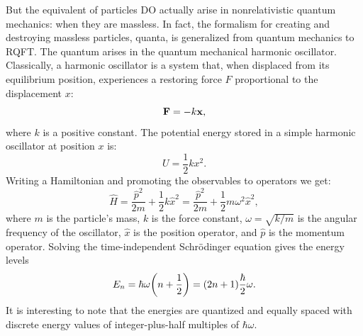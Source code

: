 But the equivalent of particles DO actually arise in nonrelativistic quantum mechanics: when they are massless. In fact, the formalism for creating and destroying massless particles, quanta, is generalized from quantum mechanics to RQFT. The quantum arises in the quantum mechanical harmonic oscillator. Classically, a harmonic oscillator is a system that, when displaced from its equilibrium position, experiences a restoring force $F$ proportional to the displacement $x$:
\begin{equation}
\vb{F}=-k\vb{x},
\end{equation}
where $k$ is a positive constant. The potential energy stored in a simple harmonic oscillator at position $x$ is:
\begin{equation}
U=\frac{1}{2}kx^2.
\end{equation}
Writing a Hamiltonian and promoting the observables to operators we get:
\begin{equation}
\hat{H} = \frac{\hat{p}^2}{2m} + \frac{1}{2}k\hat{x}^2 = \frac{\hat{p}^2}{2m} + \frac{1}{2}m\omega^2 \hat{x}^2,
\end{equation}
where $m$ is the particle's mass, $k$ is the force constant, $\omega = \sqrt{k/m}$ is the angular frequency of the oscillator, $\hat{x}$ is the position operator, and $\hat{p}$ is the momentum operator. Solving the time-independent Schr{\"o}dinger equation gives the energy levels
\begin{equation}
E_n=\hbar\omega\qty(n+\frac{1}{2})=\qty(2n+1)\frac{\hbar}{2}\omega.
\end{equation}
It is interesting to note that the energies are quantized and equally spaced with discrete energy values of integer-plus-half multiples of $\hbar\omega$.

